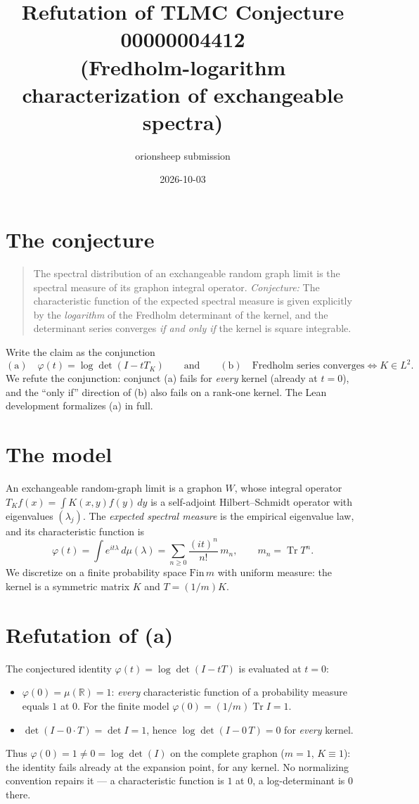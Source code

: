 \documentclass[11pt]{article}
\title{Refutation of TLMC Conjecture 00000004412\\
\large (Fredholm-logarithm characterization of exchangeable spectra)}
\author{orionsheep submission}
\date{2026-10-03}
\begin{document}
\maketitle

\section*{The conjecture}
\begin{quote}
The spectral distribution of an exchangeable random graph limit is the
spectral measure of its graphon integral operator.  \emph{Conjecture:} The
characteristic function of the expected spectral measure is given explicitly
by the \emph{logarithm} of the Fredholm determinant of the kernel, and the
determinant series converges \emph{if and only if} the kernel is square
integrable.
\end{quote}

Write the claim as the conjunction
\[
\mathrm{(a)}\quad \varphi(t)=\log\det(I-tT_K)\qquad\text{and}\qquad
\mathrm{(b)}\quad \text{Fredholm series converges}\iff K\in L^2 .
\]
We refute the conjunction: conjunct (a) fails for \emph{every} kernel
(already at $t=0$), and the ``only if'' direction of (b) also fails on a
rank-one kernel.  The Lean development formalizes (a) in full.

\section*{The model}
An exchangeable random-graph limit is a graphon $W$, whose integral operator
$T_K f(x)=\int K(x,y)f(y)\,dy$ is a self-adjoint Hilbert--Schmidt operator
with eigenvalues $(\lambda_j)$.  The \emph{expected spectral measure} is the
empirical eigenvalue law, and its characteristic function is
\[
\varphi(t)=\int e^{it\lambda}\,d\mu(\lambda)
=\sum_{n\ge 0}\frac{(it)^n}{n!}\,m_n,\qquad m_n=\operatorname{Tr}T^n .
\]
We discretize on a finite probability space $\mathrm{Fin}\,m$ with uniform
measure: the kernel is a symmetric matrix $K$ and $T=(1/m)K$.

\section*{Refutation of (a)}
The conjectured identity $\varphi(t)=\log\det(I-tT)$ is evaluated at $t=0$:
\begin{itemize}
\item $\varphi(0)=\mu(\mathbb R)=1$: \emph{every} characteristic function of
a probability measure equals $1$ at $0$.  For the finite model
$\varphi(0)=(1/m)\operatorname{Tr}I=1$.
\item $\det(I-0\cdot T)=\det I=1$, hence $\log\det(I-0\,T)=0$ for \emph{every}
kernel.
\end{itemize}
Thus $\varphi(0)=1\ne 0=\log\det(I)$ on the complete graphon
($m=1$, $K\equiv 1$): the identity fails already at the expansion point, for
any kernel.  No normalizing convention repairs it --- a characteristic
function is $1$ at $0$, a log-determinant is $0$ there.
\end{document}
